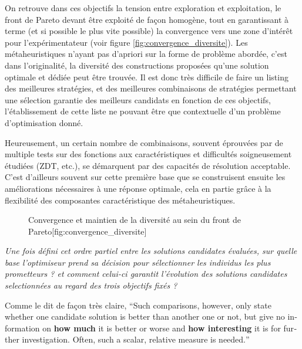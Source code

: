 On retrouve dans ces objectifs la tension entre exploration et exploitation, le front de Pareto devant être exploité de façon homogène, tout en garantissant à terme (et si possible le plus vite possible) la convergence vers une zone d'intérêt pour l'expérimentateur (voir figure \ref{fig:convergence_diversite}). Les métaheuristiques n'ayant pas d'apriori sur la forme de problème abordée, c'est dans l'originalité, la diversité des constructions proposées qu'une solution optimale et dédiée peut être trouvée. Il est donc très difficile de faire un listing des meilleures stratégies, et des meilleures combinaisons de stratégies permettant une sélection garantie des meilleurs candidats en fonction de ces objectifs, l'établissement de cette liste ne pouvant être que contextuelle d'un problème d'optimisation donné.

Heureusement, un certain nombre de combinaisons, souvent éprouvées par de multiple tests sur des fonctions aux caractéristiques et difficultés soigneusement étudiées (ZDT, etc.), se démarquent par des capacités de résolution acceptable. C'est d'ailleurs souvent sur cette première base que se construisent ensuite les améliorations nécessaires à une réponse optimale, cela en partie grâce à la flexibilité des composantes caractéristique des métaheuristiques.

\begin{figure}[!htbp]
  \begin{sidecaption}{Convergence et maintien de la diversité au sein du front de Pareto}[fig:convergence_diversite]
  \centering
  \qquad
 \end{sidecaption}
\end{figure}

\textit{Une fois défini cet ordre partiel entre les solutions candidates évaluées, sur quelle base l'optimiseur prend sa décision pour sélectionner les individus les plus prometteurs ? et comment celui-ci garantit l'évolution des solutions candidates selectionnées au regard des trois objectifs fixés ?}

Comme le dit de façon très claire,\textcite[94]{Weise2011} \foreignquote{english}{Such comparisons, however, only state whether one candidate solution is better than another one or not, but give no information on \textbf{how much} it is better or worse and \textbf{how interesting} it is for further investigation. Often, such a scalar, relative measure is needed.}

